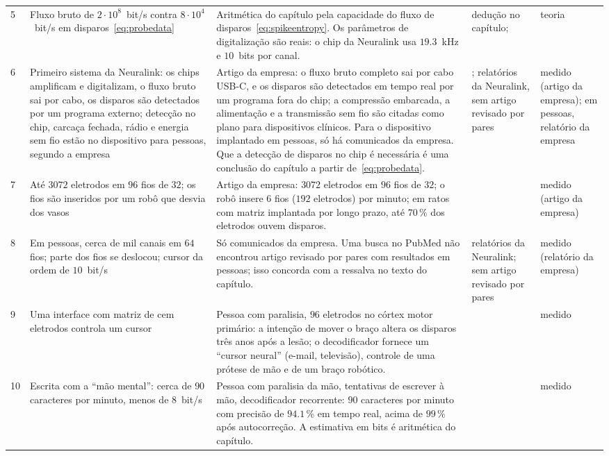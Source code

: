 {\begin{longtable}{>{\raggedright}p{0.5cm}>{\raggedright}p{4.0cm}>{\raggedright}p{5.6cm}>{\raggedright}p{2.3cm}>{\raggedright\arraybackslash}p{1.7cm}}
5 & Fluxo bruto de $2\cdot10^8$~bit/s contra $8\cdot10^4$~bit/s em disparos~\eqref{eq:probedata} & Aritmética do capítulo pela capacidade do fluxo de disparos~\eqref{eq:spikeentropy}. Os parâmetros de digitalização são reais: o chip da Neuralink usa $19.3$~kHz e $10$~bits por canal. & dedução no capítulo; \cite{Rieke1997, Musk2019} & teoria \\
6 & Primeiro sistema da Neuralink: os chips amplificam e digitalizam, o fluxo bruto sai por cabo, os disparos são detectados por um programa externo; detecção no chip, carcaça fechada, rádio e energia sem fio estão no dispositivo para pessoas, segundo a empresa & Artigo da empresa: o fluxo bruto completo sai por cabo USB-C, e os disparos são detectados em tempo real por um programa fora do chip; a compressão embarcada, a alimentação e a transmissão sem fio são citadas como plano para dispositivos clínicos. Para o dispositivo implantado em pessoas, só há comunicados da empresa. Que a detecção de disparos no chip é necessária é uma conclusão do capítulo a partir de~\eqref{eq:probedata}. & \cite{Musk2019}; relatórios da Neuralink, sem artigo revisado por pares & medido (artigo da empresa); em pessoas, relatório da empresa \\
7 & Até $3072$ eletrodos em $96$ fios de $32$; os fios são inseridos por um robô que desvia dos vasos & Artigo da empresa: $3072$ eletrodos em $96$ fios de $32$; o robô insere $6$ fios ($192$ eletrodos) por minuto; em ratos com matriz implantada por longo prazo, até $70\,\%$ dos eletrodos ouvem disparos. & \cite{Musk2019} & medido (artigo da empresa) \\
8 & Em pessoas, cerca de mil canais em $64$ fios; parte dos fios se deslocou; cursor da ordem de $10$~bit/s & Só comunicados da empresa. Uma busca no PubMed não encontrou artigo revisado por pares com resultados em pessoas; isso concorda com a ressalva no texto do capítulo. & relatórios da Neuralink; sem artigo revisado por pares & medido (relatório da empresa) \\
9 & Uma interface com matriz de cem eletrodos controla um cursor & Pessoa com paralisia, $96$ eletrodos no córtex motor primário: a intenção de mover o braço altera os disparos três anos após a lesão; o decodificador fornece um ``cursor neural'' (e-mail, televisão), controle de uma prótese de mão e de um braço robótico. & \cite{Hochberg2006} & medido \\
10 & Escrita com a ``mão mental'': cerca de $90$ caracteres por minuto, menos de $8$~bit/s & Pessoa com paralisia da mão, tentativas de escrever à mão, decodificador recorrente: $90$ caracteres por minuto com precisão de $94.1\,\%$ em tempo real, acima de $99\,\%$ após autocorreção. A estimativa em bits é aritmética do capítulo. & \cite{Willett2021} & medido \\

\end{longtable}}
